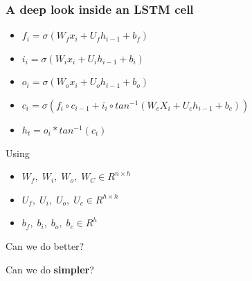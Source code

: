 \documentclass{beamer}
\begin{document}
\begin{frame}
    \frametitle{A deep look inside an LSTM cell}
    \begin{itemize}
        \item $f_i = \sigma (W_f x_i + U_f h_{i-1} + b_f)$
        \item $i_i = \sigma (W_i x_i + U_i h_{i-1} + b_i)$
        \item $o_i = \sigma (W_o x_i + U_o h_{i-1} + b_o)$
        \item $c_i = \sigma (f_i \circ c_{i-1} + i_i \circ tan^{-1}(W_c X_i + U_c h_{i-1} + b_c))$
        \item $h_t = o_i * tan^{-1}(c_i)$
    \end{itemize}
    \vspace{0.5cm}
    Using
    \begin{itemize}
        \item $W_f,\;W_i,\;W_o,\;W_C \in R^{n\times h}$
        \item $U_f,\;U_i,\;U_o,\;U_c \in R^{h\times h}$
        \item $b_f,\;b_i,\;b_o,\;b_c \in R^h$
    \end{itemize}
    \vspace{0.5cm}

    \pause

    \begin{center}
        \Large Can we do better?
    \end{center}
    
    \pause

    \begin{center}
        \Large Can we do \textbf{simpler}?
    \end{center}
\end{frame}
\end{document}
